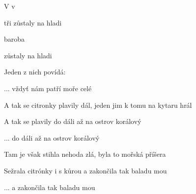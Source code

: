 

\zs
V      v 

 tři   zůstaly na hladi
\ks

\zr
{}baroba


zůstaly na hladi
\kr

\zs
Jeden z nich povídá: 
\ks

\zr  ... vždyť nám patří moře celé \kr

\zs
A tak se citronky plavily dál, jeden jim k tomu na kytaru hrál

A tak se plavily do dáli až na ostrov korálový
\ks

\zr  ... do dáli až na ostrov korálový \kr

\zs
Tam je však stihla nehoda zlá, byla to mořská příšera

Sežrala citrónky i s kůrou a zakončila tak baladu mou
\ks

\zr  ... a zakončila tak baladu mou \kr

\kp
























